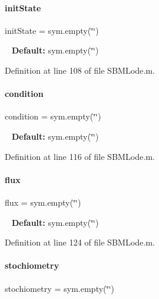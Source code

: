 \paragraph{\texorpdfstring{init\+State}{initState}}
{\footnotesize\ttfamily init\+State = sym.\+empty(\char`\"{}\char`\"{})}

~\newline
{\bfseries Default\+:} sym.\+empty(\char`\"{}\char`\"{}) 

Definition at line 108 of file S\+B\+M\+Lode.\+m.

\mbox{\label{class_s_b_m_lode_a4824b91cc0e6b5f112bdd8049af4d7d6}} 
\paragraph{\texorpdfstring{condition}{condition}}
{\footnotesize\ttfamily condition = sym.\+empty(\char`\"{}\char`\"{})}

~\newline
{\bfseries Default\+:} sym.\+empty(\char`\"{}\char`\"{}) 

Definition at line 116 of file S\+B\+M\+Lode.\+m.

\mbox{\label{class_s_b_m_lode_a96d7a28b6a4428be15fc1017d19343fa}} 
\paragraph{\texorpdfstring{flux}{flux}}
{\footnotesize\ttfamily flux = sym.\+empty(\char`\"{}\char`\"{})}

~\newline
{\bfseries Default\+:} sym.\+empty(\char`\"{}\char`\"{}) 

Definition at line 124 of file S\+B\+M\+Lode.\+m.

\mbox{\label{class_s_b_m_lode_a8d6dd1568c43b32f1810a5fe9ef6100f}} 
\paragraph{\texorpdfstring{stochiometry}{stochiometry}}
{\footnotesize\ttfamily stochiometry = sym.\+empty(\char`\"{}\char`\"{})}

